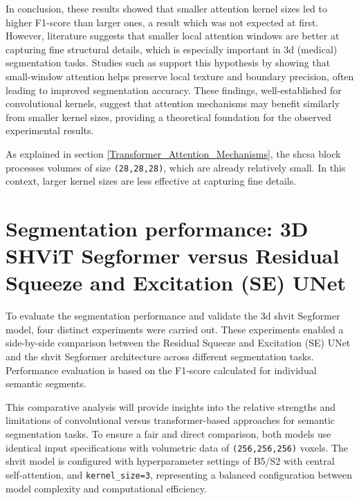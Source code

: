 \medskip

In conclusion, these results showed that smaller attention kernel sizes led to higher F1-score than larger ones, a result which was not expected at first. However, literature suggests that smaller local attention windows are better at capturing fine structural details, which is especially important in \gls{3d} (medical) segmentation tasks. Studies such as \cite{Huang_2024, wu2024fewshotmedicalimagesegmentation, app142311365} support this hypothesis by showing that small-window attention helps preserve local texture and boundary precision, often leading to improved segmentation accuracy. These findings, well-established for convolutional kernels, suggest that attention mechanisms may benefit similarly from smaller kernel sizes, providing a theoretical foundation for the observed experimental results.

\medskip

As explained in section \ref{Transformer_Attention_Mechanisms}, the \gls{shcsa} block processes volumes of size {\tt (28,28,28)}, which are already relatively small. In this context, larger kernel sizes are less effective at capturing fine details.




\section[3D SHViT Segformer versus Residual SE UNet]{Segmentation performance: 3D SHViT Segformer versus Residual Squeeze and Excitation (SE) UNet}
To evaluate the segmentation performance and validate the \gls{3d} \gls{shvit} Segformer model, four distinct experiments were carried out. These experiments enabled a side-by-side comparison between the Residual Squeeze and Excitation (SE) UNet \cite{contribution_martin_leipert} and the \gls{shvit} Segformer architecture across different segmentation tasks. Performance evaluation is based on the F1-score calculated for individual semantic segments.

\medskip

This comparative analysis will provide insights into the relative strengths and limitations of convolutional versus transformer-based approaches for semantic segmentation tasks. To ensure a fair and direct comparison, both models use identical input specifications with volumetric data of {\tt (256,256,256)} voxels. The \gls{shvit} model is configured with hyperparameter settings of B5/S2 with central self-attention, and {\tt kernel\_size=3}, representing a balanced configuration between model complexity and computational efficiency. 



